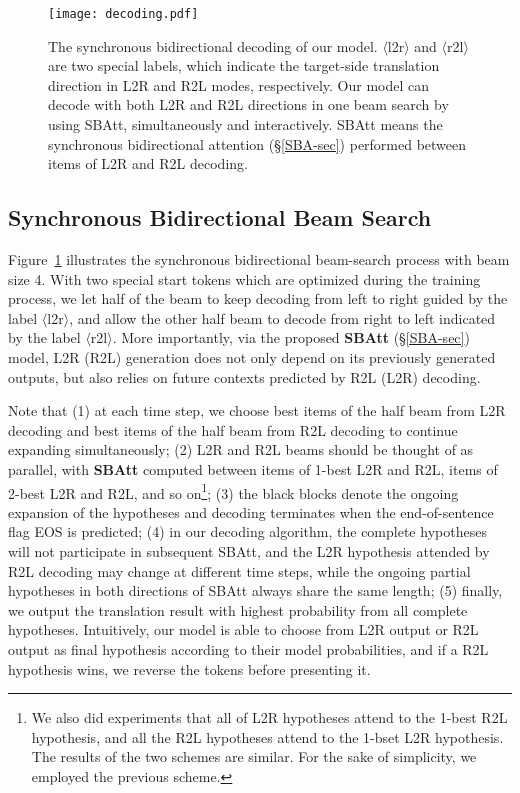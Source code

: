 \documentclass[11pt,a4paper]{article}
\begin{document}
\begin{CJK*}{UTF8}{gbsn}
\begin{figure}
	\centering
	\texttt{[image: decoding.pdf]}
	\caption{The synchronous bidirectional decoding of our model. $\langle${l2r}$\rangle$ and $\langle${r2l}$\rangle$ are two special labels, which indicate the target-side translation direction in L2R and R2L modes, respectively.
	Our model can decode with both L2R and R2L directions in one beam search by using SBAtt, simultaneously and interactively.
	SBAtt means the synchronous bidirectional attention (\S\ref{SBA-sec}) performed between items of L2R and R2L decoding.
	}\label{decoding}
\end{figure}

\subsection{Synchronous Bidirectional Beam Search} \label{SBBS-sec}
Figure~\ref{decoding} illustrates the synchronous bidirectional beam-search process with beam size 4.
With two special start tokens which are optimized during the training process, we let half of the beam to keep decoding from left to right guided by the label $\langle${l2r}$\rangle$, and allow the other half beam to decode from right to left indicated by the label $\langle${r2l}$\rangle$.
More importantly, via the proposed \textbf{SBAtt} (\S\ref{SBA-sec}) model, L2R (R2L) generation does not only depend on its previously generated outputs, but also relies on future contexts predicted by R2L (L2R) decoding.

Note that 
(1) at each time step, we choose best items of the half beam from L2R decoding and best items of the half beam from R2L decoding to continue expanding simultaneously;
(2) L2R and R2L beams should be thought of as parallel, with \textbf{SBAtt} computed between items of 1-best L2R and R2L, items of 2-best L2R and R2L, and so on{\footnote[2]{We also did experiments that all of L2R hypotheses attend to the 1-best R2L hypothesis, and all the R2L hypotheses attend to the 1-bset L2R hypothesis. The results of the two schemes are similar. For the sake of simplicity, we employed the previous scheme.}};
(3) the black blocks denote the ongoing expansion of the hypotheses and decoding terminates when the end-of-sentence flag EOS is predicted;
(4) in our decoding algorithm, the complete hypotheses will not participate in subsequent SBAtt, and the L2R hypothesis attended by R2L decoding may change at different time steps, while the ongoing partial hypotheses in both directions of SBAtt always share the same length;
(5) finally, we output the translation result with highest probability from all complete hypotheses.
Intuitively, our model is able to choose from L2R output or R2L output as final hypothesis according to their model probabilities, and if a R2L hypothesis wins, we reverse the tokens before presenting it.



\end{CJK*}
\end{document}
